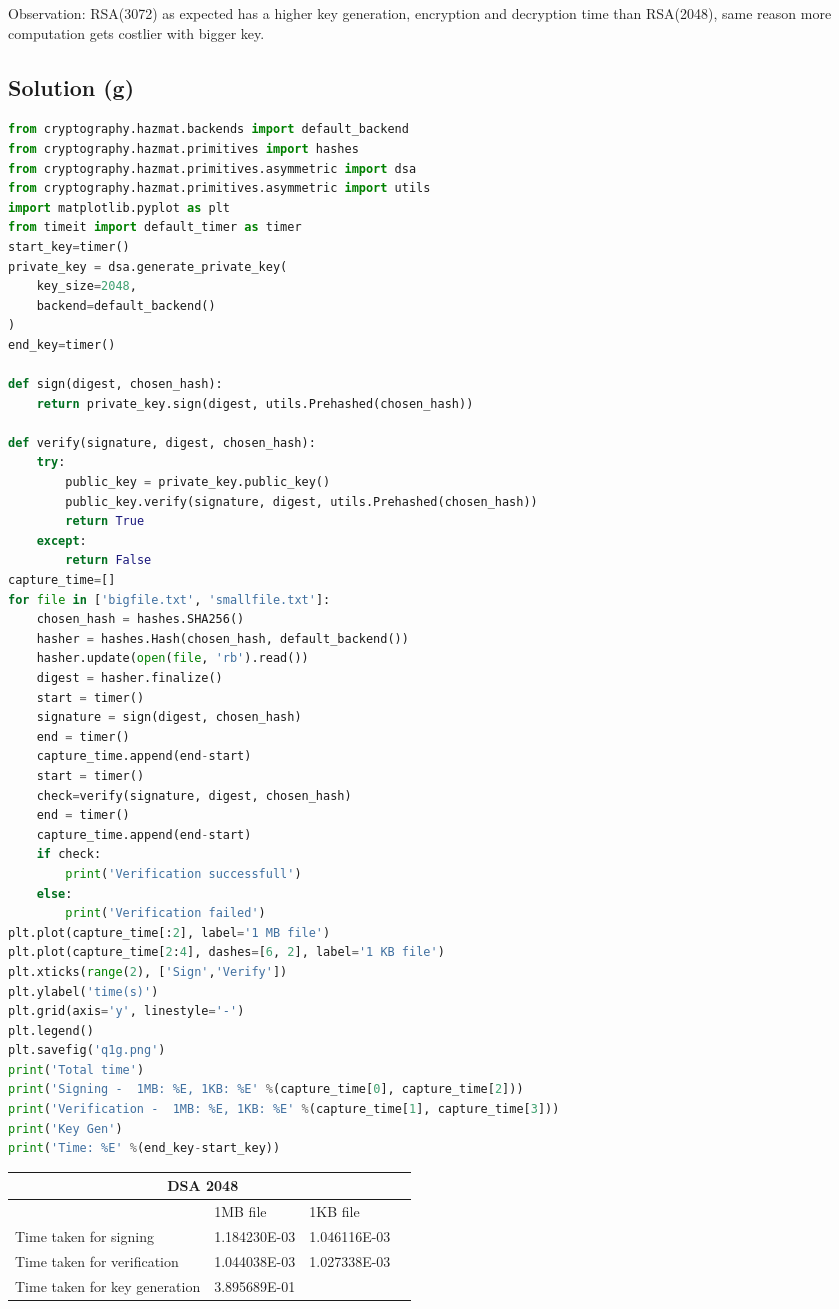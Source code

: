 \documentclass[12pt]{article}%
\begin{document}
Observation:
RSA(3072) as expected has a higher key generation, encryption and decryption time than RSA(2048), same reason more computation gets costlier with bigger key.

\subsection{Solution (g)}
\begin{lstlisting}[language=Python]
from cryptography.hazmat.backends import default_backend
from cryptography.hazmat.primitives import hashes
from cryptography.hazmat.primitives.asymmetric import dsa
from cryptography.hazmat.primitives.asymmetric import utils
import matplotlib.pyplot as plt
from timeit import default_timer as timer
start_key=timer()
private_key = dsa.generate_private_key(
    key_size=2048,
    backend=default_backend()
)
end_key=timer()

def sign(digest, chosen_hash):
    return private_key.sign(digest, utils.Prehashed(chosen_hash))

def verify(signature, digest, chosen_hash):
    try:
        public_key = private_key.public_key()
        public_key.verify(signature, digest, utils.Prehashed(chosen_hash))
        return True
    except:
        return False
capture_time=[]
for file in ['bigfile.txt', 'smallfile.txt']:
    chosen_hash = hashes.SHA256()
    hasher = hashes.Hash(chosen_hash, default_backend())
    hasher.update(open(file, 'rb').read())
    digest = hasher.finalize()
    start = timer()
    signature = sign(digest, chosen_hash)
    end = timer()
    capture_time.append(end-start)
    start = timer()
    check=verify(signature, digest, chosen_hash)
    end = timer()
    capture_time.append(end-start)
    if check:
        print('Verification successfull')
    else:
        print('Verification failed')
plt.plot(capture_time[:2], label='1 MB file')
plt.plot(capture_time[2:4], dashes=[6, 2], label='1 KB file')
plt.xticks(range(2), ['Sign','Verify'])
plt.ylabel('time(s)')
plt.grid(axis='y', linestyle='-')
plt.legend()
plt.savefig('q1g.png')
print('Total time')
print('Signing -  1MB: %E, 1KB: %E' %(capture_time[0], capture_time[2]))
print('Verification -  1MB: %E, 1KB: %E' %(capture_time[1], capture_time[3]))
print('Key Gen')
print('Time: %E' %(end_key-start_key))

\end{lstlisting}
\begin{tabular}{ |p{8cm}|p{3cm}|p{3cm}|p{3cm} }
 \hline
 \multicolumn{3}{|c|}{DSA 2048} \\
 \hline
	 & 1MB file & 1KB file\\
 \hline
 Time taken for signing  &   1.184230E-03   &  1.046116E-03 \\
  \hline
 Time taken for verification &   1.044038E-03 & 	1.027338E-03\\
 \hline
 Time taken for key generation & 3.895689E-01   & 	\\
 \hline
\end{tabular}
\end{document}
